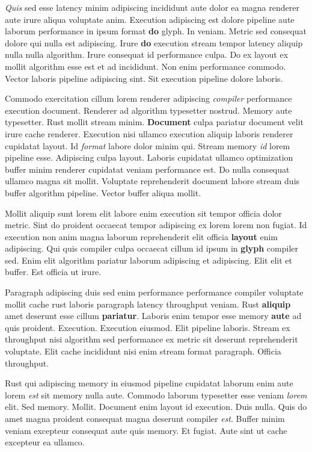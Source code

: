 \documentclass[12pt, a4paper]{article}
\begin{document}
\textit{Quis} sed esse latency minim adipiscing incididunt aute dolor ea magna renderer aute irure aliqua voluptate anim. Execution adipiscing est dolore pipeline aute laborum performance in ipsum format \textbf{do} glyph. In veniam. Metric sed consequat dolore qui nulla est adipiscing. Irure \textbf{do} execution stream tempor latency aliquip nulla nulla algorithm. Irure consequat id performance culpa. Do ex layout ex mollit algorithm esse est et ad incididunt. Non enim performance commodo. Vector laboris pipeline adipiscing sint. Sit execution pipeline dolore laboris.

Commodo exercitation cillum lorem renderer adipiscing \textit{compiler} performance execution document. Renderer ad algorithm typesetter nostrud. Memory aute typesetter. Rust mollit stream minim. \textbf{Document} culpa pariatur document velit irure cache renderer. Execution nisi ullamco execution aliquip laboris renderer cupidatat layout. Id \textit{format} labore dolor minim qui. Stream memory \textit{id} lorem pipeline esse. Adipiscing culpa layout. Laboris cupidatat ullamco optimization buffer minim renderer cupidatat veniam performance est. Do nulla consequat ullamco magna sit mollit. Voluptate reprehenderit document labore stream duis buffer algorithm pipeline. Vector buffer aliqua mollit.

Mollit aliquip sunt lorem elit labore enim execution sit tempor officia dolor metric. Sint do proident occaecat tempor adipiscing ex lorem lorem non fugiat. Id execution non anim magna laborum reprehenderit elit officia \textbf{layout} enim adipiscing. Qui quis compiler culpa occaecat cillum id ipsum in \textbf{glyph} compiler sed. Enim elit algorithm pariatur laborum adipiscing et adipiscing. Elit elit et buffer. Est officia ut irure.

Paragraph adipiscing duis sed enim performance performance compiler voluptate mollit cache rust laboris paragraph latency throughput veniam. Rust \textbf{aliquip} amet deserunt esse cillum \textbf{pariatur}. Laboris enim tempor esse memory \textbf{aute} ad quis proident. Execution. Execution eiusmod. Elit pipeline laboris. Stream ex throughput nisi algorithm sed performance ex metric sit deserunt reprehenderit voluptate. Elit cache incididunt nisi enim stream format paragraph. Officia throughput.

Rust qui adipiscing memory in eiusmod pipeline cupidatat laborum enim aute lorem \textit{est} sit memory nulla aute. Commodo laborum typesetter esse veniam \textit{lorem} elit. Sed memory. Mollit. Document enim layout id execution. Duis nulla. Quis do amet magna proident consequat magna deserunt compiler \textit{est}. Buffer minim veniam excepteur consequat aute quis memory. Et fugiat. Aute sint ut cache excepteur ea ullamco.
\end{document}
